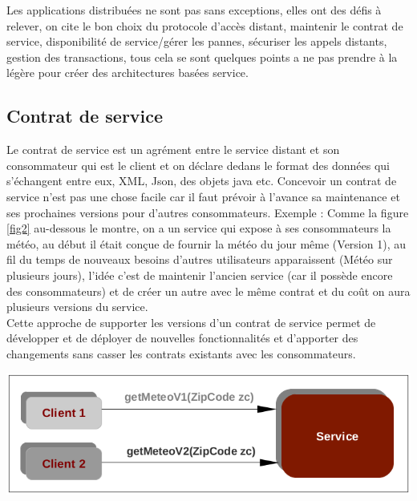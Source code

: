 \documentclass[12pt, a4paper, openany]{report}
\begin{document}
 Les applications distribuées ne sont pas sans exceptions, elles ont des défis à relever, on cite le bon choix du protocole d’accès distant, maintenir le contrat de service, disponibilité de service/gérer les pannes, sécuriser les appels distants, gestion des transactions, tous cela se sont quelques points a ne pas prendre à la légère pour créer des architectures basées service.\\
 
  \subsection{Contrat de service}
  Le contrat de service est un agrément entre le service distant et son consommateur qui est le client et on déclare dedans le format des données qui s’échangent entre eux, XML, Json, des objets java etc. Concevoir un contrat de service n’est pas une chose facile car il faut prévoir à l’avance sa maintenance et ses prochaines versions pour d’autres consommateurs. Exemple : Comme la figure \ref{fig2} au-dessous le montre, on a un service qui expose à ses consommateurs la météo, au début il était conçue de fournir la météo du jour même (Version 1), au fil du temps de nouveaux besoins d’autres utilisateurs apparaissent (Météo sur plusieurs jours), l’idée c’est de maintenir l’ancien service (car il possède encore des consommateurs) et de créer un autre avec le même contrat et du coût on aura plusieurs versions du service.\\
  
  Cette approche de supporter les versions d’un contrat de service permet de développer et de déployer de nouvelles fonctionnalités et d’apporter des changements sans casser les contrats existants avec les consommateurs.\\
  
   \begin{center}
     \includegraphics[scale=0.52]{version_contrat_2.png}
     \label{fig2}
   \end{center}  
  
\end{document}
